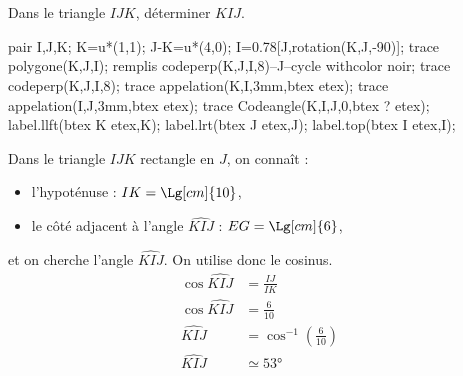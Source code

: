 \begin{methode}
    \exercice    
    Dans le triangle $IJK$, déterminer $\widehat{KIJ}$.\\
    \begin{Geometrie}[CoinHD={(6u,4.5u)}]        
        pair I,J,K;
        K=u*(1,1);
        J-K=u*(4,0);
        I=0.78[J,rotation(K,J,-90)];
        trace polygone(K,J,I);
        remplis codeperp(K,J,I,8)--J--cycle withcolor noir;
        trace codeperp(K,J,I,8);
        trace appelation(K,I,3mm,btex  etex);
        trace appelation(I,J,3mm,btex  etex);                
        trace Codeangle(K,I,J,0,btex ? etex);
        label.llft(btex K etex,K);
        label.lrt(btex J etex,J);
        label.top(btex I etex,I);
    \end{Geometrie}
    \correction
    Dans le triangle $IJK$ rectangle en $J$, on connaît :
    \begin{itemize}        
        \item l'hypoténuse : $IK=\Lg[cm]{10}$,
        \item le côté adjacent à l'angle $\widehat{KIJ}$ : $EG=\Lg[cm]{6}$,
    \end{itemize}
    et on cherche l'angle $\widehat{KIJ}$. On utilise donc le cosinus.
    \begin{align*}
        \cos\widehat{KIJ}&=\frac{IJ}{IK}\\
        \cos\widehat{KIJ}&=\frac{6}{10}\\
        \widehat{KIJ}&=\cos^{-1}\left(\frac{6}{10}\right)\\
        \widehat{KIJ}&\simeq\ang{53}
    \end{align*}
\end{methode}